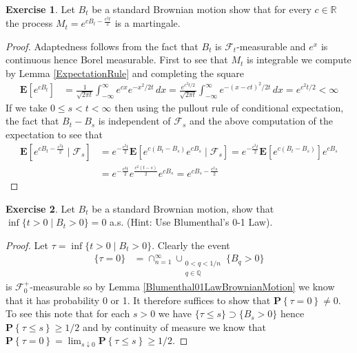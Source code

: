 \documentclass{amsbook}
\theoremstyle{definition}
\newtheorem{xca}{Exercise}
\theoremstyle{remark}
\newcommand{\expectation}[1]{\textbf{E}\left[#1\right]}
\newcommand{\cexpectationlong}[2]{\textbf{E}\left[ #2 \mid #1 \right]}
\newcommand{\probability}[1]{\textbf{P}\left \{#1 \right \}}
\newcommand{\reals}{\mathbb{R}}
\newcommand{\rationals}{\mathbb{Q}}
\begin{document}
\begin{xca}Let $B_t$ be a standard Brownian motion show that for every
  $c \in \reals$ the process $M_t = e^{c B_t - \frac{c^2t}{2}}$ is a martingale.
\end{xca}
\begin{proof}
Adaptedness follows from the fact that $B_t$ is
$\mathcal{F}_t$-measurable and $e^x$ is continuous hence Borel
measurable.  First to see that $M_t$ is integrable we compute by Lemma
\ref{ExpectationRule} and completing the
square
\begin{align*}
\expectation{e^{cB_t}} &= \frac{1}{\sqrt{2\pi t}}
\int_{-\infty}^\infty e^{c x} e^{-x^2/2t} \, dx = \frac{ e^{c^2t/2}}{\sqrt{2\pi t}}
\int_{-\infty}^\infty e^{-(x-ct)^2/2t} \, dx = e^{c^2t/2} < \infty
\end{align*}
If we take $0 \leq s < t < \infty$ then using the pullout rule of
conditional expectation, the fact that $B_t -
B_s$ is independent of $\mathcal{F}_s$ and the above computation of
the expectation to see that
\begin{align*}
\cexpectationlong{\mathcal{F}_s}{e^{c B_t - \frac{c^2t}{2}}}
&=e^{- \frac{c^2t}{2}}\cexpectationlong{\mathcal{F}_s}{e^{c (B_t -B_s)} e^{cB_s} } 
= e^{- \frac{c^2t}{2}}\expectation{e^{c (B_t -B_s)}} e^{cB_s} \\
&= e^{- \frac{c^2t}{2} }e^{\frac{c^2(t-s)}{2}}  e^{cB_s} 
= e^{c B_s - \frac{c^2s}{2}}
\end{align*}
\end{proof}

\begin{xca}Let $B_t$ be a standard Brownian motion, show that $\inf
  \lbrace t > 0 \mid B_t > 0 \rbrace = 0$ a.s.  (Hint: Use
  Blumenthal's 0-1 Law).
\end{xca}
\begin{proof}
Let $\tau = \inf \lbrace t > 0 \mid B_t > 0 \rbrace$.  Clearly the
event 
\begin{align*}
\lbrace \tau = 0 \rbrace &= \cap_{n=1}^\infty \cup_{\substack{0 < q <
    1/n\\ q \in \rationals}} \lbrace B_q > 0 \rbrace
\end{align*}
is  $\mathcal{F}^+_0$-measurable so by Lemma
  \ref{Blumenthal01LawBrownianMotion} we know that it has probability
  0 or 1.  It therefore suffices to show that $\probability { \tau =
    0} \neq 0$.  To see this note that for each $s > 0$ we have
$\lbrace \tau \leq s \rbrace \supset \lbrace B_s > 0 \rbrace$ hence
$\probability{\tau \leq s} \geq 1/2$ and by continuity of measure we
know that $\probability {\tau = 0} = \lim_{s \downarrow 0} \probability{\tau \leq s} \geq 1/2$.
\end{proof}
\end{document}
